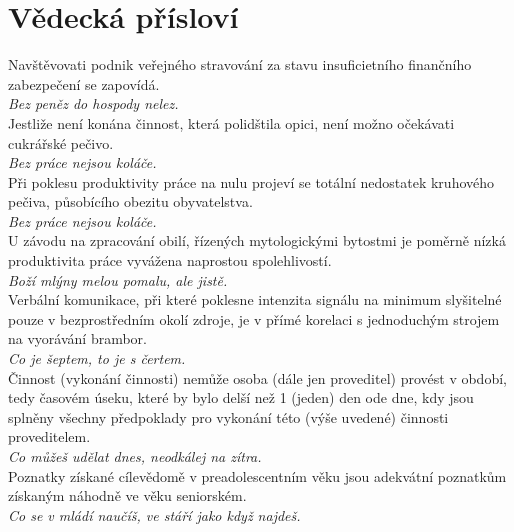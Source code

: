 
\section{Vědecká přísloví}
\begin{multicols}{\value{columnsgames}}

\noindent
Navštěvovati podnik veřejného stravování za stavu insuficietního
finančního zabezpečení se zapovídá.\\[1 mm]
{\sl Bez peněz do hospody nelez.}\\

\noindent
Jestliže není konána činnost, která polidštila opici, není
možno očekávati cukrářské pečivo.\\[1 mm]
{\sl Bez práce nejsou koláče.}\\

\noindent
Při poklesu produktivity práce na nulu projeví se totální
nedostatek kruhového pečiva, působícího obezitu obyvatelstva.\\[1 mm]
{\sl Bez práce nejsou koláče.}\\

\noindent
U závodu na zpracování obilí, řízených mytologickými bytostmi
je poměrně nízká produktivita práce vyvážena naprostou
spolehlivostí.\\[1 mm]
{\sl Boží mlýny melou pomalu, ale jistě.}\\

\noindent
Verbální komunikace, při které poklesne intenzita signálu na minimum
slyšitelné pouze v bezprostředním okolí zdroje, je v přímé korelaci
s jednoduchým strojem na vyorávání brambor.\\[1 mm]
{\sl Co je šeptem, to je s čertem.}\\

\noindent
Činnost (vykonání činnosti) nemůže osoba (dále jen proveditel)
provést v období, tedy časovém úseku, které by bylo delší než 1 (jeden)
den ode dne, kdy jsou splněny všechny předpoklady pro vykonání této
(výše uvedené) činnosti proveditelem.\\[1 mm]
{\sl Co můžeš udělat dnes, neodkálej na zítra.}\\

\noindent
Poznatky získané cílevědomě v preadolescentním věku jsou adekvátní
poznatkům získaným náhodně ve věku seniorském.\\[1 mm]
{\sl Co se v mládí naučíš, ve stáří jako když najdeš.}\\


\end{multicols}
